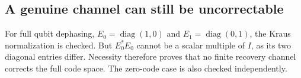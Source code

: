 \subsection{A genuine channel can still be uncorrectable}
For full qubit dephasing, $E_0=\operatorname{diag}(1,0)$ and $E_1=\operatorname{diag}(0,1)$, the Kraus normalization is checked. But $E_0^*E_0$ cannot be a scalar multiple of $I$, as its two diagonal entries differ. Necessity therefore proves that no finite recovery channel corrects the full code space. The zero-code case is also checked independently.

